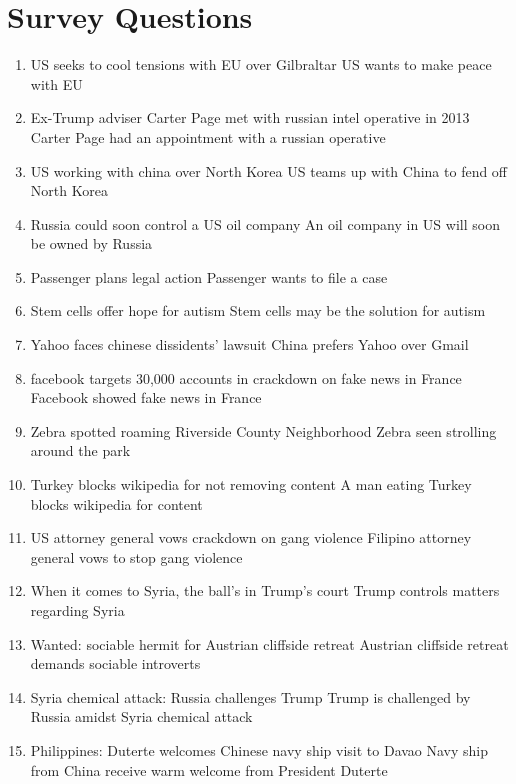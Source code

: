 \documentclass[journal]{./IEEEtran}
\begin{document}
    \section{Survey Questions}
    \label{appendix:survey}
    	\begin{enumerate}
		\item US seeks to cool tensions with EU over Gilbraltar \newline
		US wants to make peace with EU
		\item Ex-Trump adviser Carter Page met with russian intel operative in 2013\newline
		Carter Page had an appointment with a russian operative
		\item US working with china over North Korea \newline
		US teams up with China to fend off North Korea
		\item Russia could soon control a US oil company \newline
		An oil company in US will soon be owned by Russia
		\item Passenger plans legal action \newline
		Passenger wants to file a case
		\item Stem cells offer hope for autism \newline
		Stem cells may be the solution for autism
		\item Yahoo faces chinese dissidents' lawsuit \newline
		China prefers Yahoo over Gmail
		\item facebook targets 30,000 accounts in crackdown on fake news in France\newline
		Facebook showed fake news in France
		\item Zebra spotted roaming Riverside County Neighborhood \newline
		Zebra seen strolling around the park
		\item Turkey blocks wikipedia for not removing content \newline
		A man eating Turkey blocks wikipedia for content
		\item US attorney general vows crackdown on gang violence \newline
		Filipino attorney general vows to stop gang violence
		\item When it comes to Syria, the ball's in Trump's court \newline
		Trump controls matters regarding Syria
		\item Wanted: sociable hermit for Austrian cliffside retreat \newline
		Austrian cliffside retreat demands sociable introverts
		\item Syria chemical attack: Russia challenges Trump \newline
		Trump is challenged by Russia amidst Syria chemical attack
		\item Philippines: Duterte welcomes Chinese navy ship visit to Davao \newline
		Navy ship from China receive warm welcome from President Duterte
	\end{enumerate}
    
\end{document}
